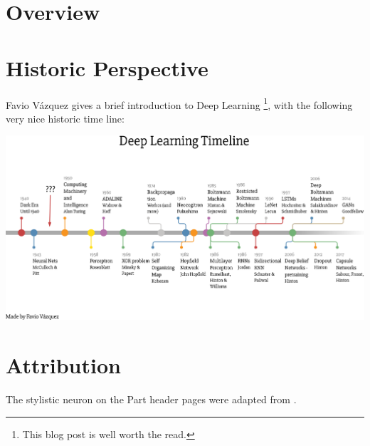 \section*{Overview}



\section*{Historic Perspective}

Favio V\'{a}zquez gives a brief introduction to Deep Learning \cite{Vazquez2018}\footnote{This blog post \cite{Vazquez2018} is well worth the read.}, with the following very  nice historic time line:\\

{\centering \includegraphics[width=\textwidth,]{pic/deeplearningtimeline.png} \par}

\section*{Attribution}

The stylistic neuron on the Part header pages were adapted from \cite{Erler2004}.